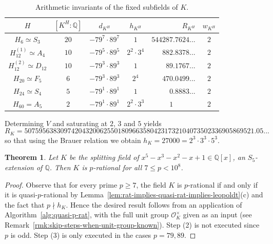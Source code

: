 \documentclass[12pt, a4paper, usenames]{amsart}
\newcommand{\Q}{\mathbb{Q}}
\theoremstyle{plain}
\newtheorem{theorem}{Theorem}[section]
\theoremstyle{remark}
\theoremstyle{definition}
\begin{document}
\begin{table}[h!]
\caption{Arithmetic invariants of the fixed subfields of $K$.}
\label{tab:subfieldss5}
\begin{tabular}{ccccrc}
\toprule
$H$ & $[K^H : \Q]$ & $d_{K^H}$ & $h_{K^H}$ & $R_{K^H}$ & $w_{K^H}$ \\\midrule
$H_{6} \simeq S_3$          & $20$ & $-79^7 \cdot 89^7$ & $1$   & $544287.7624...$      & $2$ \\\addlinespace[0.5em]
$H_{12}^{(1)} \simeq A_4$ & $10$ & $-79^5 \cdot 89^5$ & $2^{2} \cdot 3^{4}$ & $882.8378...$         & $2$ \\\addlinespace[0.5em]
$H_{12}^{(2)} \simeq D_{12}$ & $10$ & $-79^3 \cdot 89^3$ & $1$   & $89.1767...$          & $2$ \\\addlinespace[0.5em]
$H_{20} \simeq F_{5}$       & $6$  & $-79^3 \cdot 89^3$ & $2^{4}$  & $470.0499...$         & $2$ \\\addlinespace[0.5em]
$H_{24} \simeq S_{4}$       & $5$  & $-79^1 \cdot 89^1$ & $1$   & $0.8883...$           & $2$ \\\addlinespace[0.5em]
$H_{60} = A_{5}$       & $2$  & $-79^1 \cdot 89^1$ & $2^{2} \cdot 3^{3}$ & $1\phantom{.0000...}$ & $2$ \\
\bottomrule
\end{tabular}
\end{table}

Determining $V$ and saturating at $2$, $3$ and $5$ yields
\[ 
R_{K} = 5075956383097420432006255018096635804231732104073502336905869521.05... 
\]
so that using the Brauer relation we obtain $h_K = 27000 = 2^3 \cdot 3^3 \cdot 5^3$.

\begin{theorem}\label{thm:s5}
    Let $K$ be the splitting field of $x^5 - x^3 - x^2 - x + 1 \in \Q[x]$, 
    an $S_{5}$-extension of $\Q$.
    Then $K$ is $p$-rational for all $7 \leq p < 10^{8}$.
\end{theorem}

\begin{proof}
Observe that for every prime $p \geq 7$, the field
$K$ is $p$-rational if and only if it is quasi-$p$-rational by
Lemma~\ref{lem:rat-implies-quasi-rat-implies-leopoldt}(c) and
the fact that $p \nmid h_{K}$.
Hence the desired result follows from an application of Algorithm~\ref{alg:quasi-p-rat},
with the full unit group $\mathcal{O}_{K}^{\times}$ given as an input (see Remark~\ref{rmk:skip-steps-when-unit-group-known}).
Step (2) is not executed since $p$ is odd.
Step (3) is only executed in the cases $p=79,89$.
\end{proof}
\end{document}
